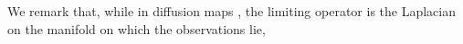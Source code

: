 %
%
%
%
%
%
%
%
%
We remark that, while in diffusion maps \cite{coifman2005geometric}, the limiting operator is the Laplacian on the manifold on which the observations lie,
